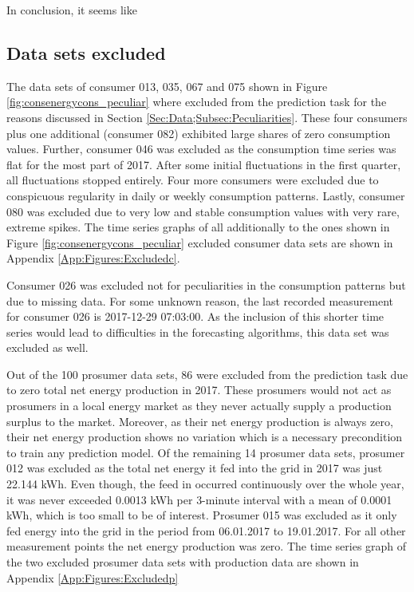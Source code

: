 In conclusion, it seems like 


\subsection{Data sets excluded}\label{Sec:Data;Subsec:Exclusion}
The data sets of consumer 013, 035, 067 and 075 shown in Figure \ref{fig:consenergycons_peculiar} where excluded from the prediction task for the reasons discussed in Section \ref{Sec:Data;Subsec:Peculiarities}. These four consumers plus one additional (consumer 082) exhibited large shares of zero consumption values. Further, consumer 046 was excluded as the consumption time series was flat for the most part of 2017. After some initial fluctuations in the first quarter, all fluctuations stopped entirely. Four more consumers were excluded due to conspicuous regularity in daily or weekly consumption patterns. Lastly, consumer 080 was excluded due to very low and stable consumption values with very rare, extreme spikes. The time series graphs of all additionally to the ones shown in Figure \ref{fig:consenergycons_peculiar} excluded consumer data sets are shown in Appendix \ref{App:Figures:Excludedc}.

Consumer 026 was excluded not for peculiarities in the consumption patterns but due to missing data. For some unknown reason, the last recorded measurement for consumer 026 is 2017-12-29 07:03:00. As the inclusion of this shorter time series would lead to difficulties in the forecasting algorithms, this data set was excluded as well.

Out of the 100 prosumer data sets, 86 were excluded from the prediction task due to zero total net energy production in 2017. These prosumers would not act as prosumers in a local energy market as they never actually supply a production surplus to the market. Moreover, as their net energy production is always zero, their net energy production shows no variation which is a necessary precondition to train any prediction model.
Of the remaining 14 prosumer data sets, prosumer 012 was excluded as the total net energy it fed into the grid in 2017 was just 22.144 kWh. Even though, the feed in occurred continuously over the whole year, it was never exceeded 0.0013 kWh per 3-minute interval with a mean of 0.0001 kWh, which is too small to be of interest. Prosumer 015 was excluded as it only fed energy into the grid in the period from 06.01.2017 to 19.01.2017. For all other measurement points the net energy production was zero. The time series graph of the two excluded prosumer data sets with production data are shown in Appendix \ref{App:Figures:Excludedp}

